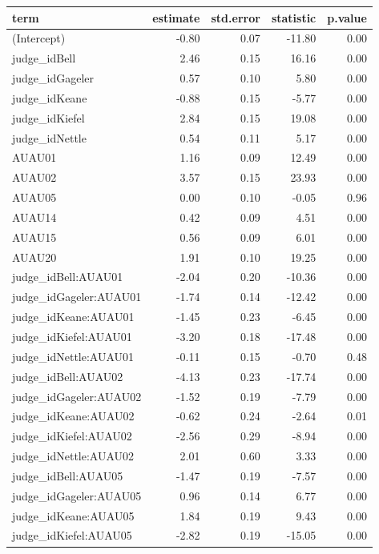 \documentclass{monashthesis}
\begin{document}
\begin{tabular}{l|r|r|r|r}
\hline
term & estimate & std.error & statistic & p.value\\
\hline
(Intercept) & -0.80 & 0.07 & -11.80 & 0.00\\
\hline
judge\_idBell & 2.46 & 0.15 & 16.16 & 0.00\\
\hline
judge\_idGageler & 0.57 & 0.10 & 5.80 & 0.00\\
\hline
judge\_idKeane & -0.88 & 0.15 & -5.77 & 0.00\\
\hline
judge\_idKiefel & 2.84 & 0.15 & 19.08 & 0.00\\
\hline
judge\_idNettle & 0.54 & 0.11 & 5.17 & 0.00\\
\hline
AUAU01 & 1.16 & 0.09 & 12.49 & 0.00\\
\hline
AUAU02 & 3.57 & 0.15 & 23.93 & 0.00\\
\hline
AUAU05 & 0.00 & 0.10 & -0.05 & 0.96\\
\hline
AUAU14 & 0.42 & 0.09 & 4.51 & 0.00\\
\hline
AUAU15 & 0.56 & 0.09 & 6.01 & 0.00\\
\hline
AUAU20 & 1.91 & 0.10 & 19.25 & 0.00\\
\hline
judge\_idBell:AUAU01 & -2.04 & 0.20 & -10.36 & 0.00\\
\hline
judge\_idGageler:AUAU01 & -1.74 & 0.14 & -12.42 & 0.00\\
\hline
judge\_idKeane:AUAU01 & -1.45 & 0.23 & -6.45 & 0.00\\
\hline
judge\_idKiefel:AUAU01 & -3.20 & 0.18 & -17.48 & 0.00\\
\hline
judge\_idNettle:AUAU01 & -0.11 & 0.15 & -0.70 & 0.48\\
\hline
judge\_idBell:AUAU02 & -4.13 & 0.23 & -17.74 & 0.00\\
\hline
judge\_idGageler:AUAU02 & -1.52 & 0.19 & -7.79 & 0.00\\
\hline
judge\_idKeane:AUAU02 & -0.62 & 0.24 & -2.64 & 0.01\\
\hline
judge\_idKiefel:AUAU02 & -2.56 & 0.29 & -8.94 & 0.00\\
\hline
judge\_idNettle:AUAU02 & 2.01 & 0.60 & 3.33 & 0.00\\
\hline
judge\_idBell:AUAU05 & -1.47 & 0.19 & -7.57 & 0.00\\
\hline
judge\_idGageler:AUAU05 & 0.96 & 0.14 & 6.77 & 0.00\\
\hline
judge\_idKeane:AUAU05 & 1.84 & 0.19 & 9.43 & 0.00\\
\hline
judge\_idKiefel:AUAU05 & -2.82 & 0.19 & -15.05 & 0.00\\

\end{tabular}
\end{document}

